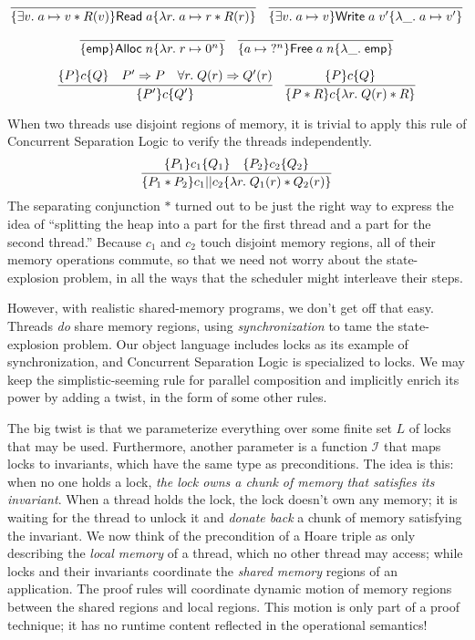 \documentclass{amsbook}
\theoremstyle{definition}
\theoremstyle{remark}
\numberwithin{section}{chapter}
\numberwithin{equation}{chapter}
\begin{document}
$$\infer{\hoare{\exists v. \; \ptsto{a}{v} * R(v)}{\mt{Read} \; a}{\lambda r. \; \ptsto{a}{r} * R(r)}}{}
\quad \infer{\hoare{\exists v. \; \ptsto{a}{v}}{\mt{Write} \; a \; v'}{\lambda \_. \; \ptsto{a}{v'}}}{}$$

$$\infer{\hoare{\emp}{\mt{Alloc} \; n}{\lambda r. \; \ptsto{r}{0^n}}}{}
\quad \infer{\hoare{\ptsto{a}{\; ?^n}}{\mt{Free} \; a \; n}{\lambda \_. \; \emp}}{}$$

$$\infer{\hoare{P'}{c}{Q'}}{
  \hoare{P}{c}{Q}
  & P' \Rightarrow P
  & \forall r. \; Q(r) \Rightarrow Q'(r)
}
\quad \infer{\hoare{P * R}{c}{\lambda r. \; Q(r) * R}}{
  \hoare{P}{c}{Q}
}$$

\modularity
When two threads use disjoint regions of memory, it is trivial to apply this rule of Concurrent Separation Logic to verify the threads independently.
$$\infer{\hoare{P_1 * P_2}{c_1 || c_2}{\lambda r. \; Q_1(r) * Q_2(r)}}{
  \hoare{P_1}{c_1}{Q_1}
  & \hoare{P_2}{c_2}{Q_2}
}$$
The separating conjunction $*$ turned out to be just the right way to express the idea of ``splitting the heap into a part for the first thread and a part for the second thread.''
Because $c_1$ and $c_2$ touch disjoint memory regions, all of their memory operations commute, so that we need not worry about the state-explosion problem, in all the ways that the scheduler might interleave their steps.

However, with realistic shared-memory programs, we don't get off that easy.
Threads \emph{do} share memory regions, using \emph{synchronization} to tame the state-explosion problem.
Our object language includes locks as its example of synchronization, and Concurrent Separation Logic is specialized to locks.
We may keep the simplistic-seeming rule for parallel composition and implicitly enrich its power by adding a twist, in the form of some other rules.

The big twist is that we parameterize everything over some finite set $L$ of locks that may be used.
\invariants
Furthermore, another parameter is a function $\mathcal I$ that maps locks to invariants, which have the same type as preconditions.
The idea is this: when no one holds a lock, \emph{the lock owns a chunk of memory that satisfies its invariant}.
When a thread holds the lock, the lock doesn't own any memory; it is waiting for the thread to unlock it and \emph{donate back} a chunk of memory satisfying the invariant.
We now think of the precondition of a Hoare triple as only describing the \emph{local memory} of a thread, which no other thread may access; while locks and their invariants coordinate the \emph{shared memory} regions of an application.
The proof rules will coordinate dynamic motion of memory regions between the shared regions and local regions.
This motion is only part of a proof technique; it has no runtime content reflected in the operational semantics!
\end{document}
